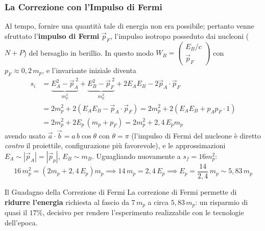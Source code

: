 \subsubsection{La Correzione con l'Impulso di Fermi}

Al tempo, fornire una quantità tale di energia non era possibile; pertanto venne sfruttato l'\textbf{impulso di Fermi} $\vec{p}_F$, l'impulso isotropo posseduto dai nucleoni ($N + P$) del bersaglio in berillio. In questo modo $W_B = \begin{pmatrix} E_B/c \\ \vec{p}_F \end{pmatrix}$ con $p_F \approx 0{,}2\,m_p$, e l'invariante iniziale diventa
\begin{align*}
    s_i &= \underbrace{E_A^2 - \vec{p}_A^{\;2}}_{m_p^2} + \underbrace{E_B^2 - \vec{p}_F^{\;2}}_{m_p^2} + 2E_AE_B - 2\vec{p}_A \cdot \vec{p}_F \\
        &= 2m_p^2 + 2\left(E_AE_B - \vec{p}_A \cdot \vec{p}_F\right)
         = 2m_p^2 + 2\left(E_AE_B + p_A p_F \cdot 1\right) \\
        &= 2m_p^2 + 2E_p\,(m_p + p_F) = 2m_p^2 + 2{,}4\,E_p m_p
\end{align*}
avendo usato $\vec{a}\cdot\vec{b} = a\,b\cos\theta$ con $\theta = \pi$ (l'impulso di Fermi del nucleone è diretto \emph{contro} il proiettile, configurazione più favorevole), e le approssimazioni $E_A \sim |\vec{p}_A| = |\vec{p}_p|$, $E_B \sim m_B$. Uguagliando nuovamente a $s_f = 16 m_p^2$:
\begin{equation}
    16\,m_p^2 = \left(2m_p + 2{,}4\,E_p\right)m_p
    \implies 14\,m_p = 2{,}4\,E_p
    \implies \boxed{E_p = \frac{14}{2{,}4}\,m_p \sim 5{,}83\,m_p}
\end{equation}

\begin{osservazione}{Il Guadagno della Correzione di Fermi}
La correzione di Fermi permette di \textbf{ridurre l'energia} richiesta al fascio da $7\,m_p$ a circa $5{,}83\,m_p$: un risparmio di quasi il $17\%$, decisivo per rendere l'esperimento realizzabile con le tecnologie dell'epoca.
\end{osservazione}
